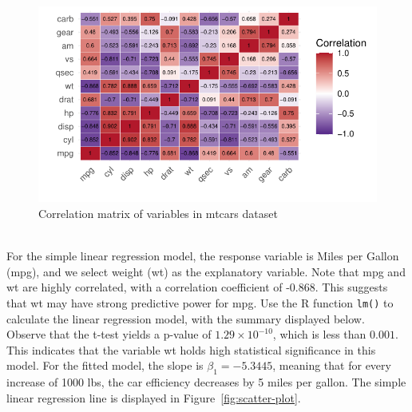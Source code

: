 \documentclass{article}\usepackage[]{graphicx}\usepackage[]{xcolor}
\makeatletter
\def\maxwidth{ %
  \ifdim\Gin@nat@width>\linewidth
    \linewidth
  \else
    \Gin@nat@width
  \fi
}
\newenvironment{knitrout}{}{} %
\makeatother
\begin{document}
\begin{knitrout}\scriptsize
{}\color{fgcolor}\begin{figure}[H]

{\centering \includegraphics[width=\maxwidth]{figure/beamer-cor-matrix-mtcars2-1} 

}

\caption[Correlation matrix of variables in mtcars dataset]{Correlation matrix of variables in mtcars dataset}\label{fig:cor-matrix-mtcars2}
\end{figure}

\end{knitrout}
\noindent
\\For the simple linear regression model, the response variable is Miles per Gallon (mpg), and we select weight (wt) as the explanatory variable. Note that mpg and wt are highly correlated, with a correlation coefficient of -0.868. This suggests that wt may have strong predictive power for mpg. Use the R function \texttt{lm()} to calculate the linear regression model, with the summary displayed below.
\noindent
\\Observe that the t-test yields a p-value of $1.29 \times 10^{-10}$, which is less than $0.001$. This indicates that the variable wt holds high statistical significance in this model. For the fitted model, the slope is $\beta_1 = -5.3445$, meaning that for every increase of 1000 lbs, the car efficiency decreases by 5 miles per gallon. The simple linear regression line is displayed in Figure~\ref{fig:scatter-plot}.\\
\end{document}
